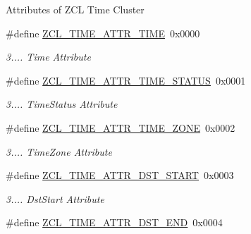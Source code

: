 Attributes of Z\-C\-L Time Cluster \begin{DoxyCompactItemize}
\item 
\hypertarget{group__zcl__time_ga6abf0e2cc70ac533ebe153a40185be63}{\#define \hyperlink{group__zcl__time_ga6abf0e2cc70ac533ebe153a40185be63}{Z\-C\-L\-\_\-\-T\-I\-M\-E\-\_\-\-A\-T\-T\-R\-\_\-\-T\-I\-M\-E}~0x0000}\label{group__zcl__time_ga6abf0e2cc70ac533ebe153a40185be63}

\begin{DoxyCompactList}\small\item\em 3.... Time Attribute \end{DoxyCompactList}\item 
\hypertarget{group__zcl__time_ga5931aa648c777cb21c8337249b6e1699}{\#define \hyperlink{group__zcl__time_ga5931aa648c777cb21c8337249b6e1699}{Z\-C\-L\-\_\-\-T\-I\-M\-E\-\_\-\-A\-T\-T\-R\-\_\-\-T\-I\-M\-E\-\_\-\-S\-T\-A\-T\-U\-S}~0x0001}\label{group__zcl__time_ga5931aa648c777cb21c8337249b6e1699}

\begin{DoxyCompactList}\small\item\em 3.... Time\-Status Attribute \end{DoxyCompactList}\item 
\hypertarget{group__zcl__time_ga28b3510bbe09eed7e47fe5b4f24c5bad}{\#define \hyperlink{group__zcl__time_ga28b3510bbe09eed7e47fe5b4f24c5bad}{Z\-C\-L\-\_\-\-T\-I\-M\-E\-\_\-\-A\-T\-T\-R\-\_\-\-T\-I\-M\-E\-\_\-\-Z\-O\-N\-E}~0x0002}\label{group__zcl__time_ga28b3510bbe09eed7e47fe5b4f24c5bad}

\begin{DoxyCompactList}\small\item\em 3.... Time\-Zone Attribute \end{DoxyCompactList}\item 
\hypertarget{group__zcl__time_gaaf1e36f36654ae9f4d1c453cdf9b526b}{\#define \hyperlink{group__zcl__time_gaaf1e36f36654ae9f4d1c453cdf9b526b}{Z\-C\-L\-\_\-\-T\-I\-M\-E\-\_\-\-A\-T\-T\-R\-\_\-\-D\-S\-T\-\_\-\-S\-T\-A\-R\-T}~0x0003}\label{group__zcl__time_gaaf1e36f36654ae9f4d1c453cdf9b526b}

\begin{DoxyCompactList}\small\item\em 3.... Dst\-Start Attribute \end{DoxyCompactList}\item 
\hypertarget{group__zcl__time_ga05ac335a9f642b671514517d8f4c4a16}{\#define \hyperlink{group__zcl__time_ga05ac335a9f642b671514517d8f4c4a16}{Z\-C\-L\-\_\-\-T\-I\-M\-E\-\_\-\-A\-T\-T\-R\-\_\-\-D\-S\-T\-\_\-\-E\-N\-D}~0x0004}\label{group__zcl__time_ga05ac335a9f642b671514517d8f4c4a16}


\end{DoxyCompactItemize}
